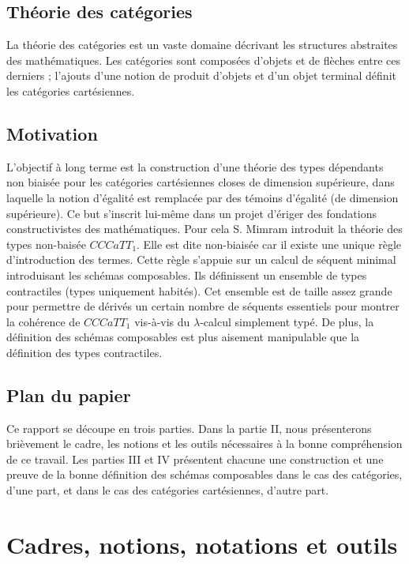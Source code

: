 \documentclass[conference]{IEEEtran}
\begin{document}
\subsection{Théorie des catégories} La théorie des catégories est un vaste domaine décrivant les structures abstraites des mathématiques. Les catégories sont composées d'objets et de flèches entre ces derniers ; l'ajouts d'une notion de produit d'objets et d'un objet terminal définit les catégories cartésiennes.

\subsection{Motivation} L'objectif à long terme est la construction d'une théorie des types dépendants non biaisée pour les catégories cartésiennes closes de dimension supérieure, dans laquelle la notion d'égalité est remplacée par des témoins d'égalité (de dimension supérieure). Ce but s'inscrit lui-même dans un projet d'ériger des fondations constructivistes des mathématiques. Pour cela S. Mimram introduit la théorie des types non-baisée $CCCaTT_1$. Elle est dite non-biaisée car il existe une unique règle d'introduction des termes. Cette règle s'appuie sur un calcul de séquent minimal introduisant les schémas composables. Ils définissent un ensemble de types contractiles (types uniquement habités). Cet ensemble est de taille assez grande pour permettre de dérivés un certain nombre de séquents essentiels pour montrer la cohérence de $CCCaTT_1$ vis-à-vis du $\lambda$-calcul simplement typé. De plus, la définition des schémas composables est plus aisement manipulable que la définition des types contractiles.

\subsection{Plan du papier} Ce rapport se découpe en trois parties. Dans la partie II, nous présenterons brièvement le cadre, les notions et les outils nécessaires à la bonne compréhension de ce travail. Les parties III et IV présentent chacune une construction et une preuve de la bonne définition des schémas composables dans le cas des catégories, d'une part, et dans le cas des catégories cartésiennes, d'autre part.

\section{Cadres, notions, notations et outils}
\end{document}
